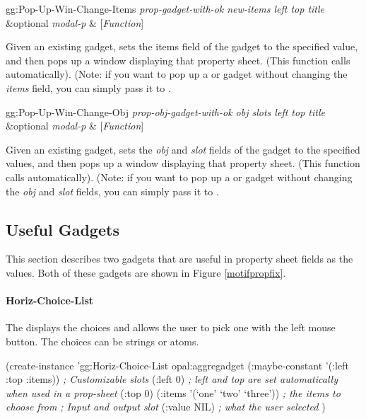 \begin{programexample}
gg:Pop-Up-Win-Change-Items {\it prop-gadget-with-ok new-items left top title} \&optional {\it modal-p} & [{\it Function}]
\end{programexample}
Given an existing gadget,  sets the items
field of the gadget
to the specified value, and then pops up a window displaying that
property sheet.  (This function calls 
automatically).  (Note: if you want to pop up a
 or  gadget
without changing the {\it items} field, you can simply pass it to
.

\begin{programexample}
gg:Pop-Up-Win-Change-Obj {\it prop-obj-gadget-with-ok obj slots left top title} \&optional {\it modal-p} & [{\it Function}]
\end{programexample}
Given an existing gadget,  sets the {\it obj}
and {\it slot} fields of the gadget
to the specified values, and then pops up a window displaying that
property sheet.  (This function calls 
automatically).  (Note: if you want to pop up a
 or
 gadget without
changing the {\it obj} and
{\it slot} fields, you can simply pass it to .

\subsection{Useful Gadgets}
\label{propusefulgadgets}

This section describes two gadgets that are useful in property sheet
fields as the values.  Both of these gadgets are shown in Figure
\ref{motifpropfix}.

\paragraph{Horiz-Choice-List}
The  displays the choices and allows the user to
pick one with the left mouse button.  The choices can be strings or
atoms.

\begin{programexample}
(create-instance 'gg:Horiz-Choice-List opal:aggregadget
   (:maybe-constant '(:left :top :items))
   {\it ; Customizable slots}
   (:left 0) {\it ; left and top are set automatically when used in a prop-sheet}
   (:top 0)
   (:items '(`one' `two' `three')) {\it ; the items to choose from}
   {\it ; Input and output slot}
   (:value NIL) {\it ; what the user selected}
   )
\end{programexample}

